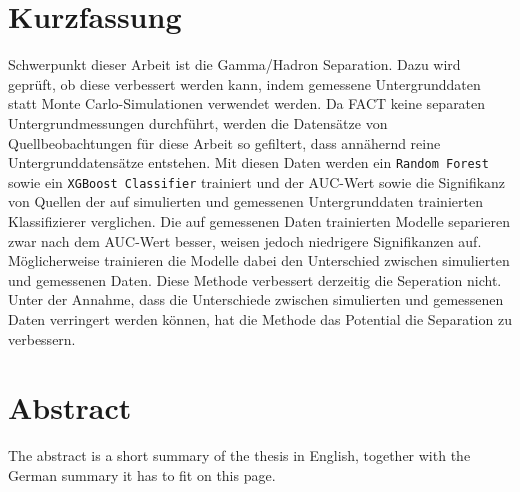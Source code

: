 \thispagestyle{plain}

\section*{Kurzfassung}
Schwerpunkt dieser Arbeit ist die Gamma/Hadron Separation. 
Dazu wird geprüft, ob diese verbessert werden kann, indem gemessene Untergrunddaten statt Monte Carlo-Simulationen verwendet werden.
Da FACT keine separaten Untergrundmessungen durchführt, werden die Datensätze von Quellbeobachtungen für diese Arbeit so gefiltert, dass annähernd reine Untergrunddatensätze entstehen.
Mit diesen Daten werden ein \texttt{Random Forest} sowie ein \texttt{XGBoost Classifier} trainiert und der AUC-Wert sowie die Signifikanz von Quellen der auf simulierten und gemessenen Untergrunddaten trainierten Klassifizierer verglichen. 
Die auf gemessenen Daten trainierten Modelle separieren zwar nach dem AUC-Wert besser, weisen jedoch niedrigere Signifikanzen auf. 
Möglicherweise trainieren die Modelle dabei den Unterschied zwischen simulierten und gemessenen Daten. 
Diese Methode verbessert derzeitig die Seperation nicht. 
Unter der Annahme, dass die Unterschiede zwischen simulierten und gemessenen Daten verringert werden können, hat die Methode das Potential die Separation zu verbessern. 
\section*{Abstract}
\begin{english}
The abstract is a short summary of the thesis in English, together with the German summary it has to fit on this page.
\end{english}

